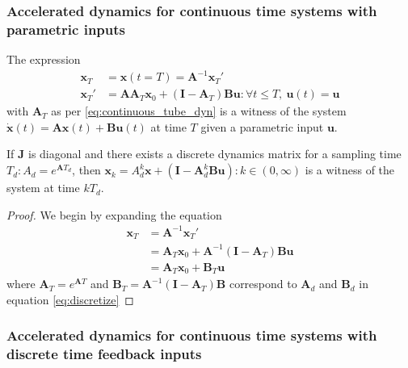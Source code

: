 \documentclass[sigconf]{llncs}
\newcommand{\mat}[1]{\boldsymbol{#1}}
\renewcommand{\vec}[1]{\boldsymbol{#1}}
\begin{document}
 \subsubsection{Accelerated dynamics for continuous time systems with parametric inputs}\label{asec:real_discrete_param_inputs}
\begin{theorem}
The expression
 \begin{align}
 \vec{x}_T&=\vec{x}(t=T)=\mat{A}^{-1}\vec{x}_T'\nonumber\\
\vec{x}_T'&=\mat{A}\mat{A}_T\vec{x}_0 + (\mat{I}-\mat{A}_T)\mat{B}\vec{u} : \forall t \leq T,\ \vec{u}(t)=\vec{u} 
 \end{align}
 with $\mat{A}_T$ as per \eqref{eq:continuous_tube_dyn} is a witness of the system $\dot{\vec{x}}(t)=\mat{A}\vec{x}(t)+\mat{B}\vec{u}(t)$ at time $T$ given a parametric input $\vec{u}$.
 \end{theorem}
 \begin{corollary}
 If $\mat{J}$ is diagonal and there exists a discrete dynamics matrix for a sampling time $T_d :  A_d=e^{\mat{A} T_d}$, then $\vec{x}_k=A_d^k\vec{x}+(\mat{I}-\mat{A}_d^k\mat{B}\vec{u}) : k \in (0,\infty)$ is a witness of the system at time $kT_d$.
 \end{corollary}
 \begin{proof}
 We begin by expanding the equation
 \begin{align}
 \vec{x}_T&=\mat{A}^{-1}\vec{x}_T'\nonumber\\
 &=\mat{A}_T\vec{x}_0 + \mat{A}^{-1}(\mat{I}-\mat{A}_T)\mat{B}\vec{u}\nonumber\\
 &= \mat{A}_T\vec{x}_0 + \mat{B}_T\vec{u}
 \end{align}
 where $\mat{A}_T=e^{\mat{A}T}$ and $\mat{B}_T=\mat{A}^{-1}(\mat{I}-\mat{A}_T)\mat{B}$ correspond to $\mat{A}_d$ and $\mat{B}_d$ in equation \eqref{eq:discretize}
 \end{proof}

 \subsubsection{Accelerated dynamics for continuous time systems with discrete time feedback inputs}\label{asec:real_discrete_feedback_inputs}
\end{document}
